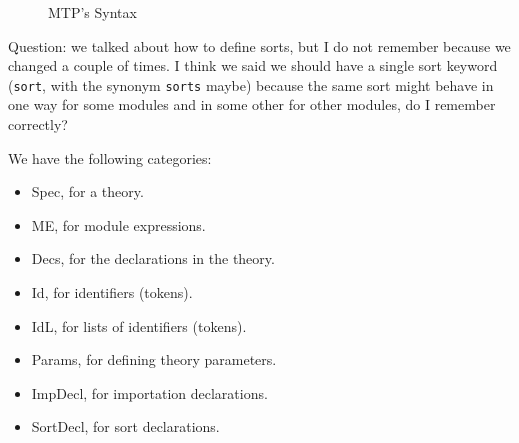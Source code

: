

\begin{figure}[t]
\caption{MTP's Syntax}
\label{fig:syntax}
\end{figure}

{\color{red}Question:} we talked about how to define sorts, but I do not remember because
we changed a couple of times. I think we said we should have a single sort keyword (\texttt{sort},
with the synonym \texttt{sorts} maybe) because the same sort might behave in one way for some
modules and in some other for other modules, do I remember correctly?

We have the following categories:
\begin{itemize}
\item
Spec, for a theory.

\item
ME, for module expressions.

\item
Decs, for the declarations in the theory.

\item
Id, for identifiers (tokens).

\item
IdL, for lists of identifiers (tokens).

\item
Params, for defining theory parameters.

\item
ImpDecl, for importation declarations.

\item
SortDecl, for sort declarations.
\end{itemize}



















